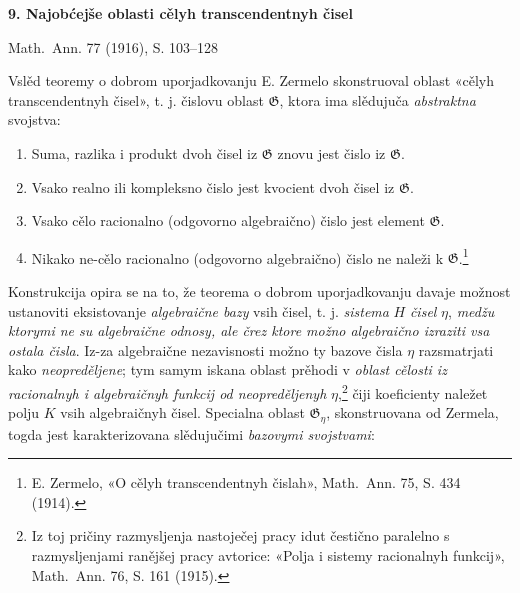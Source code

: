 \documentclass[11pt]{article}
\begin{document}
\begin{center}
{\Large\bfseries 9. Najobćejše oblasti cělyh transcendentnyh čisel}\par
\vspace{1.2em}
\mbox{Math. Ann.} 77 (1916), S. 103--128
\end{center}

\vspace{1em}

Vslěd teoremy o dobrom uporjadkovanju E. Zermelo skonstruoval oblast «cělyh transcendentnyh čisel», t. j. čislovu oblast $\mathfrak G$, ktora ima slědujuča {\itshape abstraktna} svojstva:
\begin{enumerate}
\item[I.] Suma, razlika i produkt dvoh čisel iz $\mathfrak G$ znovu jest čislo iz $\mathfrak G$.
\item[II.] Vsako realno ili kompleksno čislo jest kvocient dvoh čisel iz $\mathfrak G$.
\item[III.] Vsako cělo racionalno (odgovorno algebraično) čislo jest element $\mathfrak G$.
\item[IV.] Nikako ne-cělo racionalno (odgovorno algebraično) čislo ne naleži k $\mathfrak G$.\footnote{E. Zermelo, «O cělyh transcendentnyh čislah», \mbox{Math. Ann.} 75, S. 434 (1914).}
\end{enumerate}

Konstrukcija opira se na to, že teorema o dobrom uporjadkovanju davaje možnost ustanoviti eksistovanje {\itshape algebraične bazy} vsih čisel, t. j. {\itshape sistema} $H$ {\itshape čisel} $\eta$, {\itshape medžu ktorymi ne su algebraične odnosy, ale črez ktore možno algebraično izraziti vsa ostala čisla}. Iz-za algebraične nezavisnosti možno ty bazove čisla $\eta$ razsmatrjati kako {\itshape neopreděljene}; tym samym iskana oblast prěhodi v {\itshape oblast cělosti iz racionalnyh i algebraičnyh funkcij od neopreděljenyh} $\eta$,\footnote{Iz toj pričiny razmysljenja nastoječej pracy idut čestično paralelno s razmysljenjami ranějšej pracy avtorice: «Polja i sistemy racionalnyh funkcij», \mbox{Math. Ann.} 76, S. 161 (1915).} čiji koeficienty naležet polju $K$ vsih algebraičnyh čisel. Specialna oblast $\mathfrak G_\eta$, skonstruovana od Zermela, togda jest karakterizovana slědujučimi {\itshape bazovymi svojstvami}:
\end{document}
